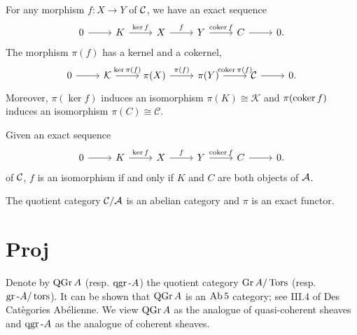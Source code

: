 \documentclass[dissertation.tex]{subfiles}
\begin{document}
\begin{lem}
  For any morphism $f \colon X \rightarrow Y$ of $\mathcal{C}$, we have an exact sequence 
  $$\begin{tikzcd}
    0 \arrow{r} & K \arrow{r}{\ker{f}} & X \arrow{r}{f} & Y \arrow{r}{\coker{f}} & C \arrow{r} & 0.
  \end{tikzcd}$$ 
  The morphism $\pi(f)$ has a kernel and a cokernel,
  $$\begin{tikzcd}
    0 \arrow{r} & \mathcal{K} \arrow{r}{\ker{\pi(f)}} & \pi(X) \arrow{r}{\pi(f)} & \pi(Y) \arrow{r}{\coker{\pi(f)}} & \mathcal{C} \arrow{r} & 0.
  \end{tikzcd}$$
  Moreover, $\pi(\ker{f})$ induces an isomorphism $\pi(K) \cong \mathcal{K}$ and $\pi(\operatorname{coker}{f})$ induces an isomorphism $\pi(C) \cong \mathcal{C}$.
\end{lem}

\begin{lem}
  Given an exact sequence 
  $$\begin{tikzcd}
    0 \arrow{r} & K \arrow{r}{\ker{f}} & X \arrow{r}{f} & Y \arrow{r}{\coker{f}} & C \arrow{r} & 0.
  \end{tikzcd}$$ 
  of $\mathcal{C}$, $f$ is an isomorphism if and only if $K$ and $C$ are both objects of $\mathcal{A}$.
\end{lem}

\begin{prop}
  The quotient category $\mathcal{C}/\mathcal{A}$ is an abelian category and $\pi$ is an exact functor.
\end{prop}

\section{Proj}
Denote by $\operatorname{QGr}A$ (resp. $\operatorname{qgr}\text{-}A$) the quotient category $\Gr{A}/\Tors$ (resp. $\operatorname{gr}\text{-}A/\operatorname{tors}$).
It can be shown that $\operatorname{QGr}A$ is an $\operatorname{Ab} 5$ category; see III.4 of Des Cat\`{e}gories Ab\'{e}lienne.
We view $\operatorname{QGr}A$ as the analogue of quasi-coherent sheaves and $\operatorname{qgr}\text{-}A$ as the analogue of coherent sheaves.
\end{document}
